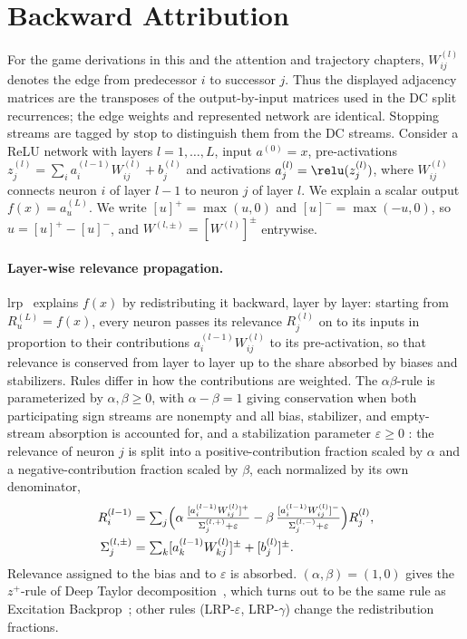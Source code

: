 \section{Backward Attribution}\label{ptnb:sec:background}

For the game derivations in this and the attention and trajectory chapters, $W^{(l)}_{ij}$ denotes the edge from predecessor $i$ to successor $j$. Thus the displayed adjacency matrices are the transposes of the output-by-input matrices used in the DC split recurrences; the edge weights and represented network are identical. Stopping streams are tagged by $\mathrm{stop}$ to distinguish them from the DC streams. Consider a ReLU network with layers $l = 1,\dots,L$, input $a^{(0)} = x$, pre-activations
$z^{(l)}_j = \sum_i a^{(l-1)}_i W^{(l)}_{ij} + b^{(l)}_j$ and activations $a^{(l)}_j =
    \relu(z^{(l)}_j)$, where $W^{(l)}_{ij}$ connects neuron $i$ of layer $l{-}1$ to neuron $j$ of layer
$l$. We explain a scalar output $f(x) = a^{(L)}_u$. We write $[u]^{+} = \max(u,0)$ and $[u]^{-} =
    \max(-u,0)$, so $u = [u]^+ - [u]^-$, and $W^{(l,\pm)} = [W^{(l)}]^{\pm}$ entrywise.

\paragraph{Layer-wise relevance propagation.} \ac{lrp}~\parencite{Bach2015} explains $f(x)$ by redistributing it backward, layer by layer: starting
from $R^{(L)}_u = f(x)$, every neuron passes its relevance $R^{(l)}_j$ on to its inputs in
proportion to their contributions $a^{(l-1)}_i W^{(l)}_{ij}$ to its pre-activation, so that
relevance is conserved from layer to layer up to the share absorbed by biases and stabilizers.
Rules differ in how the contributions are weighted. The $\alpha\beta$-rule is parameterized by
$\alpha,\beta\geq0$, with $\alpha-\beta=1$ giving conservation when both participating sign streams are nonempty and all bias, stabilizer, and empty-stream absorption is accounted for, and a
stabilization parameter $\varepsilon \ge 0$ : the relevance of neuron $j$ is split into a
positive-contribution fraction scaled by $\alpha$ and a negative-contribution fraction scaled by
$\beta$, each normalized by its own denominator,
\begin{align}\label{ptnb:eq:lrp-ab}
    R^{(l-1)}_i &= \textstyle\sum_j \Bigl( \alpha\, \tfrac{[a^{(l-1)}_i
    W^{(l)}_{ij}]^+}{\Sigma^{(l,+)}_j + \varepsilon} - \beta\, \tfrac{[a^{(l-1)}_i
    W^{(l)}_{ij}]^-}{\Sigma^{(l,-)}_j + \varepsilon} \Bigr) R^{(l)}_j, \nonumber\\
    \Sigma^{(l,\pm)}_j &= \textstyle\sum_k [a^{(l-1)}_k W^{(l)}_{kj}]^{\pm} + [b^{(l)}_j]^{\pm}.
\end{align}
Relevance assigned to the bias and to $\varepsilon$ is absorbed. $(\alpha,\beta) = (1,0)$ gives the
$z^+$-rule of Deep Taylor decomposition~\parencite{Montavon2017DeepTaylor}, which turns out to be the same rule
as Excitation Backprop~\parencite{Zhang2018pointinggame}; other rules (LRP-$\varepsilon$, LRP-$\gamma$)
change the redistribution fractions.

